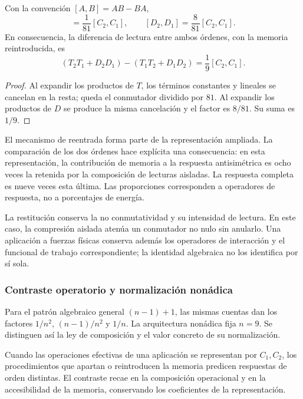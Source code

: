 \begin{proposition}
\label{md:restop:proposicion-orden}
Con la convención $[A,B]=AB-BA$,
\begin{equation}
 [T_2,T_1]=\frac1{81}[C_2,C_1],\qquad
 [D_2,D_1]=\frac8{81}[C_2,C_1].
 \label{md:restop:reparto-conmutadores}
\end{equation}
En consecuencia, la diferencia de lectura entre ambos órdenes, con la
memoria reintroducida, es
\begin{equation}
 \boxed{(T_2T_1+D_2D_1)-(T_1T_2+D_1D_2)
 =\frac19[C_2,C_1].}
 \label{md:restop:orden-completo}
\end{equation}
\end{proposition}
\begin{proof}
Al expandir los productos de $T$, los términos constantes y lineales se
cancelan en la resta; queda el conmutador dividido por $81$.
Al expandir los productos de $D$ se produce la misma cancelación y el
factor es $8/81$. Su suma es $1/9$.
\end{proof}

El mecanismo de reentrada forma parte de la representación ampliada.
La comparación de los dos órdenes hace explícita una consecuencia:
en esta representación, la contribución de memoria a la respuesta
antisimétrica es ocho veces la retenida por la composición de lecturas
aisladas. La respuesta completa es nueve veces esta última. Las
proporciones corresponden a operadores de respuesta, no a porcentajes
de energía.

La restitución conserva la no conmutatividad y su intensidad de lectura.
En este caso, la compresión aislada atenúa un conmutador no nulo sin
anularlo. Una aplicación a fuerzas físicas conserva además los operadores
de interacción y el funcional de trabajo correspondiente; la identidad
algebraica no los identifica por sí sola.

\subsubsection{Contraste operatorio y normalización nonádica}
\label{md:restop:contraste}

Para el patrón algebraico general $(n-1)+1$, las mismas cuentas dan los
factores $1/n^2$, $(n-1)/n^2$ y $1/n$. La arquitectura nonádica fija
$n=9$. Se distinguen así la ley de composición y el valor concreto de
su normalización.

Cuando las operaciones efectivas de una aplicación se representan por
$C_1,C_2$, los procedimientos que apartan o reintroducen la memoria
predicen respuestas de orden distintas. El contraste recae en la
composición operacional y en la accesibilidad de la memoria, conservando
los coeficientes de la representación.

